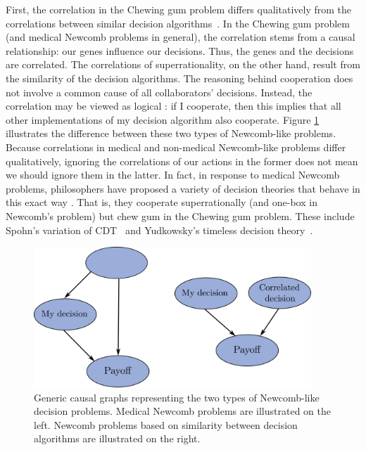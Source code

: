 First, the correlation in the Chewing gum problem differs qualitatively
from the correlations between similar decision algorithms~\parencite{OesterheldTreutlein2017}.
In the Chewing gum problem (and
medical Newcomb problems in general), the correlation stems from a
causal relationship: our genes influence our decisions. Thus, the genes
and the decisions are correlated. The correlations of superrationality,
on the other hand, result from the similarity of the decision
algorithms. The reasoning behind cooperation does not involve a common
cause of all collaborators' decisions. Instead, the correlation may be
viewed as logical \parencite{Garrabrant2016-km}: if I
cooperate, then this implies that all other implementations of my decision algorithm
also cooperate. Figure \ref{two-types} illustrates the difference between
these two types of Newcomb-like problems. Because correlations in
medical and non-medical Newcomb-like problems differ qualitatively,
ignoring the correlations of our actions in the former does not mean we
should ignore them in the latter. In fact, in response to medical
Newcomb problems, philosophers have proposed a variety of decision
theories that behave in this exact way \parencite{OesterheldTreutlein2017}. That is, they cooperate
superrationally (and one-box in
Newcomb's problem) but chew gum in the Chewing gum problem. These
include Spohn's variation of CDT~\citeyear{Spohn2003-zf,Spohn2005-tm,Spohn2012-fo} and Yudkowsky's
timeless decision theory~\citeyear{Yudkowsky2010-ul}.

\begin{figure}[h!]
    \centering
    \includegraphics[width=4.1in]{figs/two-types}
    \caption{Generic causal graphs representing the two types of Newcomb-like decision problems. Medical Newcomb problems are illustrated on the left. Newcomb problems based on similarity between decision algorithms are illustrated on the right.}
    \label{two-types}
\end{figure}

